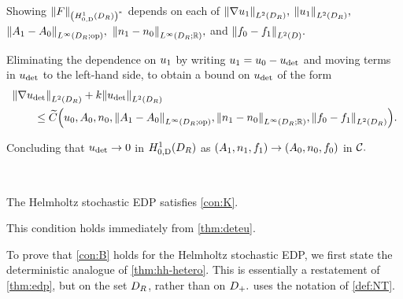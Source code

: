 \item Showing $\NHozDDRas{F}$ depends on each of $\NLtDR{\grad \uo},$ $\NLtDR{\uo},$ $\NLiDRRRdtd{\Ao-\Az},$ $\NLiDRRR{\no-\nz},$ and $\NLtD{\fz-\fo}.$
\item Eliminating the dependence on $u_{1}$ by writing $u_{1} = u_{0}-u_{\mathrm{det}}$ and moving terms in $u_{\mathrm{det}}$ to the left-hand side, to obtain a bound on $u_{\mathrm{det}}$ of the form
  \begin{align*}
&\NLtDR{\grad \ud} + k\NLtDR{\ud} \\
&\qquad\leq \Ctilde\Big(\uz,\Az,\nz,\NLiDRRRdtd{\Ao-\Az},\NLiDRRR{\no-\nz},\NLtDR{\fz-\fo}\Big).
\end{align*}
\item Concluding that $u_{\mathrm{det}}\rightarrow0$ in $\HozDDR$ as $(A_{1},n_{1},f_{1}) \rightarrow (A_{0},n_{0},f_{0})$ in $\mathcal C.$
\een\epf

\label{lem:hh-K}

\

The Helmholtz stochastic EDP satisfies \cref{con:K}.
\ele

This condition holds immediately from \cref{thm:deteu}.
\epf

To prove that \cref{con:B} holds for the Helmholtz stochastic EDP, we first state the deterministic analogue of \cref{thm:hh-hetero}. This is essentially a restatement of \cref{thm:edp}, but on the set $D_{R}$, rather than on $D_{+}.$  uses the notation of \cref{def:NT}.


\label{thm:eubedp}

\

